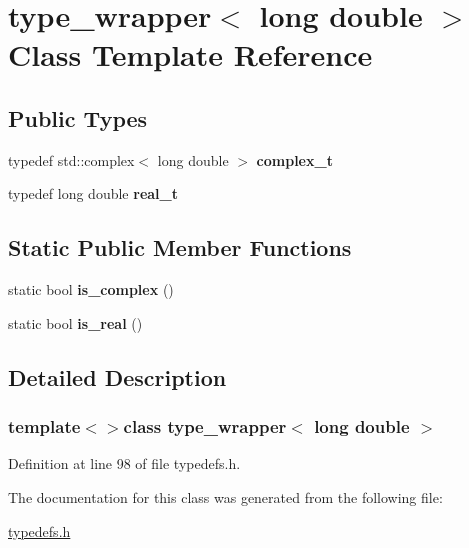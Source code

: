 \hypertarget{classtype__wrapper_3_01long_01double_01_4}{}\section{type\+\_\+wrapper$<$ long double $>$ Class Template Reference}
\label{classtype__wrapper_3_01long_01double_01_4}
\subsection*{Public Types}
\begin{DoxyCompactItemize}
\item 
\hypertarget{classtype__wrapper_3_01long_01double_01_4_afd790eb8b7cac8fc94b60bd5876debd3}{}typedef std\+::complex$<$ long double $>$ {\bfseries complex\+\_\+t}\label{classtype__wrapper_3_01long_01double_01_4_afd790eb8b7cac8fc94b60bd5876debd3}

\item 
\hypertarget{classtype__wrapper_3_01long_01double_01_4_ab5558a834db15b8845226e4f9f26b299}{}typedef long double {\bfseries real\+\_\+t}\label{classtype__wrapper_3_01long_01double_01_4_ab5558a834db15b8845226e4f9f26b299}

\end{DoxyCompactItemize}
\subsection*{Static Public Member Functions}
\begin{DoxyCompactItemize}
\item 
\hypertarget{classtype__wrapper_3_01long_01double_01_4_a455e826c3f8dac323271ba7f2875a8eb}{}static bool {\bfseries is\+\_\+complex} ()\label{classtype__wrapper_3_01long_01double_01_4_a455e826c3f8dac323271ba7f2875a8eb}

\item 
\hypertarget{classtype__wrapper_3_01long_01double_01_4_a07d5fd34f704430fbd87a39ebab6b3b8}{}static bool {\bfseries is\+\_\+real} ()\label{classtype__wrapper_3_01long_01double_01_4_a07d5fd34f704430fbd87a39ebab6b3b8}

\end{DoxyCompactItemize}


\subsection{Detailed Description}
\subsubsection*{template$<$$>$class type\+\_\+wrapper$<$ long double $>$}



Definition at line 98 of file typedefs.\+h.



The documentation for this class was generated from the following file\+:\begin{DoxyCompactItemize}
\item 
\hyperlink{typedefs_8h}{typedefs.\+h}\end{DoxyCompactItemize}
